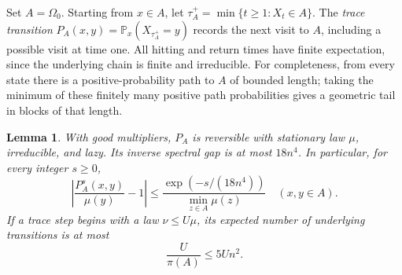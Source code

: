\documentclass[11pt]{article}
\newtheorem{lemma}[theorem]{Lemma}
\theoremstyle{definition}
\newcommand{\Prob}{\mathbb P}
\newcommand{\Om}{\Omega}
\begin{document}
Set $A=\Om_0$.  Starting from $x\in A$, let
$\tau_A^+=\min\{t\ge1:X_t\in A\}$.  The \emph{trace transition}
$P_A(x,y)=\Prob_x(X_{\tau_A^+}=y)$ records the next visit to $A$, including
a possible visit at time one.  All hitting and return times have finite
expectation, since the underlying chain is finite and irreducible.
For completeness, from every state there is a positive-probability path
to $A$ of bounded length; taking the minimum of these finitely many
positive path probabilities gives a geometric tail in blocks of that
length.

\begin{lemma}\label{lem:trace}
With good multipliers, $P_A$ is reversible with stationary law $\mu$,
irreducible, and lazy.  Its inverse spectral gap is at most $18n^4$.
In particular, for every integer $s\ge0$,
\begin{equation}\label{eq:tracemixing}
 \left|\frac{P_A^s(x,y)}{\mu(y)}-1\right|
 \le\frac{\exp(-s/(18n^4))}{\min_{z\in A}\mu(z)}
 \quad(x,y\in A).
\end{equation}
If a trace step begins with a law $\nu\le U\mu$, its expected number of
underlying transitions is at most
\begin{equation}\label{eq:returncost}
 \frac{U}{\pi(A)}\le5Un^2.
\end{equation}
\end{lemma}
\end{document}
